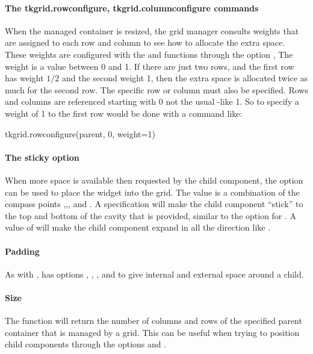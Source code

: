 \paragraph{The tkgrid.rowconfigure, tkgrid.columnconfigure commands}
When the managed container is resized, the grid manager consults
weights that are assigned to each row and column to see how to
allocate the extra space. These weights are configured with the
 and 
functions through the option ,
The weight is a value between 0 and 1. If there are just two rows, and
the first row has weight $1/2$ and the second weight 1, then the extra
space is allocated twice as much for the second row. The specific row
or column must also be specified. Rows and columns are referenced
starting with 0 not the usual \R-like 1. So to specify a weight of 1
to the first row would be done with a command like:

%
\begin{Schunk}
\begin{Sinput}
 tkgrid.rowconfigure(parent, 0, weight=1)
\end{Sinput}
\end{Schunk}
%
\paragraph{The sticky option}
When more space is available then requested by the child component,
the  option can be used to place the widget
into the grid. The value is a combination of the compass points
,,, and . A specification
 will make the child component ``stick'' to the top and
bottom of the cavity that is provided, similar to the 
option for . A value of  will make the
child component expand in all the direction like .

\paragraph{Padding}
As with ,  has options
, , ,
and  to give internal and external space around a
child.

\paragraph{Size}
The function  will return the number of columns
and rows of the specified parent container that is managed by a
grid. This can be useful when trying to position child components
through the options  and .

